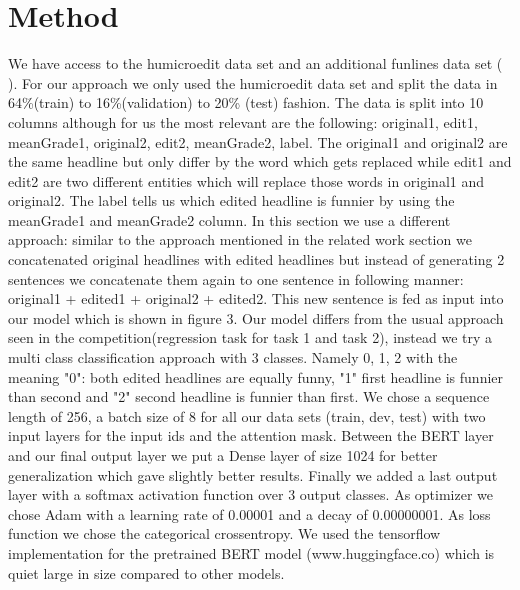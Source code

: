 \documentclass[11pt,a4paper,onecolumn,oneside,notitlepage]{article}
\begin{document}
	\section{Method}
		We have access to the humicroedit data set and an additional funlines data set (\textcite{Bert2} ).
		For our approach we only used the humicroedit data set and split the data in 64\%(train) to 16\%(validation) to 20\% (test) fashion. The data is split into 10 columns although for us the most relevant are the following: original1, edit1, meanGrade1, original2, edit2, meanGrade2, label.
		The original1 and original2 are the same headline but only differ by the word which gets replaced while edit1 and edit2 are two different entities which will replace those words in original1 and original2. The label tells us which edited headline is funnier by using the meanGrade1 and meanGrade2 column.
		In this section we use a different approach: similar to the approach mentioned in the related work section we concatenated original headlines with edited headlines but instead of generating 2 sentences we concatenate them again to one sentence in following manner: original1 + edited1 + original2 + edited2.
		This new sentence is fed as input into our model which is shown in figure 3.
		Our model differs from the usual approach seen in the competition(regression task for task 1 and task 2), instead we try a multi class classification approach with 3 classes. Namely 0, 1, 2 with the meaning "0": both edited headlines are equally funny, "1" first headline is funnier than second and "2" second headline is funnier than first.
		We chose a sequence length of 256, a batch size of 8 for all our data sets (train, dev, test) with two input layers for the input ids and the attention mask.
		Between the BERT layer and our final output layer we put a Dense layer of size 1024 for better generalization which gave slightly better results. 
		Finally we added a last output layer with a softmax activation function over 3 output classes.
		As optimizer we chose Adam with a learning rate of 0.00001 and a decay of 0.00000001. As loss function we chose the categorical crossentropy. We used the tensorflow implementation for the pretrained BERT model (www.huggingface.co) which is quiet large in size compared to other models.
		\pagebreak
\end{document}
